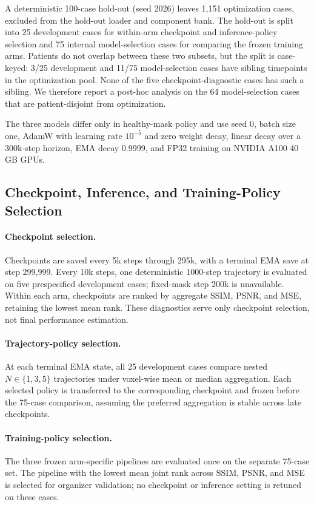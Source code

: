 \documentclass[runningheads]{llncs}
\begin{document}
A deterministic 100-case hold-out (seed 2026) leaves 1,151 optimization cases, excluded from the hold-out loader and component bank. The hold-out is split into 25 development cases for within-arm checkpoint and inference-policy selection and 75 internal model-selection cases for comparing the frozen training arms. Patients do not overlap between these two subsets, but the split is case-keyed: 3/25 development and 11/75 model-selection cases have sibling timepoints in the optimization pool. None of the five checkpoint-diagnostic cases has such a sibling. We therefore report a post-hoc analysis on the 64 model-selection cases that are patient-disjoint from optimization.

The three models differ only in healthy-mask policy and use seed 0, batch size one, AdamW \cite{loshchilov2019adamw} with learning rate $10^{-5}$ and zero weight decay, linear decay over a 300k-step horizon, EMA decay 0.9999, and FP32 training on NVIDIA A100 40\,GB GPUs.

\subsection{Checkpoint, Inference, and Training-Policy Selection} \label{sec:exp:selection}

\paragraph{\textbf{Checkpoint selection.}}
Checkpoints are saved every 5k steps through 295k, with a terminal EMA save at step 299,999. Every 10k steps, one deterministic 1000-step trajectory is evaluated on five prespecified development cases; fixed-mask step 200k is unavailable. Within each arm, checkpoints are ranked by aggregate SSIM, PSNR, and MSE, retaining the lowest mean rank. These diagnostics serve only checkpoint selection, not final performance estimation.

\paragraph{\textbf{Trajectory-policy selection.}}
At each terminal EMA state, all 25 development cases compare nested $N\in\{1,3,5\}$ trajectories under voxel-wise mean or median aggregation. Each selected policy is transferred to the corresponding checkpoint and frozen before the 75-case comparison, assuming the preferred aggregation is stable across late checkpoints.

\paragraph{\textbf{Training-policy selection.}}
The three frozen arm-specific pipelines are evaluated once on the separate 75-case set. The pipeline with the lowest mean joint rank across SSIM, PSNR, and MSE is selected for organizer validation; no checkpoint or inference setting is retuned on these cases.
\end{document}
